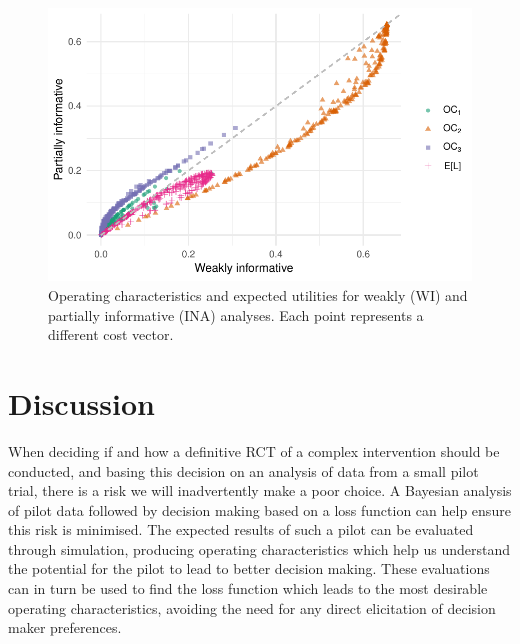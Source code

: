 \documentclass{article} %
\begin{document}
\begin{figure}
\centering
\includegraphics[scale=0.8]{./Figures/an_prior_comp}
\caption{Operating characteristics and expected utilities for weakly (WI) and partially informative (INA) analyses. Each point represents a different cost vector.}
\label{fig:an_prior_comp}
\end{figure}

\section{Discussion}\label{sec:discussion}



When deciding if and how a definitive RCT of a complex intervention should be conducted, and basing this decision on an analysis of data from a small pilot trial, there is a risk we will inadvertently make a poor choice. A Bayesian analysis of pilot data followed by decision making based on a loss function can help ensure this risk is minimised. The expected results of such a pilot can be evaluated through simulation, producing operating characteristics which help us understand the potential for the pilot to lead to better decision making. These evaluations can in turn be used to find the loss function which leads to the most desirable operating characteristics, avoiding the need for any direct elicitation of decision maker preferences.
\end{document}

